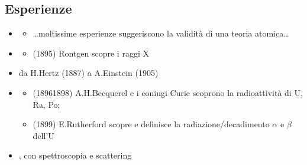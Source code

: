 \documentclass[letterpaper,10pt,italian]{jupyterBook}
\begin{document}
\subsection{Esperienze}
\label{\detokenize{ch/modern:esperienze}}\begin{itemize}
\item {} 
\sphinxAtStartPar
{}
\begin{itemize}
\item {} 
\sphinxAtStartPar
…moltissime esperienze suggeriscono la validità di una teoria atomica…

\end{itemize}

\item {} 
\sphinxAtStartPar
{}
\begin{itemize}
\item {} 
\sphinxAtStartPar
(1895) Rontgen scopre i raggi X

\end{itemize}

\item {} 
\sphinxAtStartPar
{} da H.Hertz (1887) a A.Einstein (1905)

\item {} 
\sphinxAtStartPar
{}
\begin{itemize}
\item {} 
\sphinxAtStartPar
(1896\sphinxhyphen{}1898) A.H.Becquerel e i coniugi Curie scoprono la radioattività di U, Ra, Po;

\item {} 
\sphinxAtStartPar
(1899) E.Rutherford scopre e definisce la radiazione/decadimento \(\alpha\) e \(\beta\) dell’U

\end{itemize}

\item {} 
\sphinxAtStartPar
{}, con spettroscopia e scattering

\end{itemize}
\end{document}
